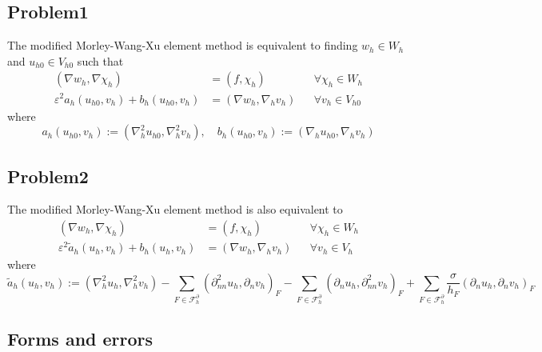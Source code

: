 \documentclass[11pt]{article}
\begin{document}
    \subsection{Problem1}\label{problem1}

    The modified Morley-Wang-Xu element method is equivalent to finding
\(w_{h} \in W_{h}\) and \(u_{h 0} \in V_{h 0}\) such that \[
\begin{aligned}
\left(\nabla w_{h}, \nabla \chi_{h}\right) &=\left(f, \chi_{h}\right) & & \forall \chi_{h} \in W_{h} \\
\varepsilon^{2} a_{h}\left(u_{h 0}, v_{h}\right)+b_{h}\left(u_{h 0}, v_{h}\right) &=\left(\nabla w_{h}, \nabla_{h} v_{h}\right) & & \forall v_{h} \in V_{h 0}
\end{aligned}
\] where \[
a_{h}\left(u_{h 0}, v_{h}\right):=\left(\nabla_{h}^{2} u_{h 0}, \nabla_{h}^{2} v_{h}\right), \quad b_{h}\left(u_{h 0}, v_{h}\right):=\left(\nabla_{h} u_{h 0}, \nabla_{h} v_{h}\right)
\]

    \subsection{Problem2}\label{problem2}

    The modified Morley-Wang-Xu element method is also equivalent to \[
\begin{aligned}
\left(\nabla w_{h}, \nabla \chi_{h}\right) &=\left(f, \chi_{h}\right) & & \forall \chi_{h} \in W_{h} \\
\varepsilon^{2} \tilde{a}_{h}\left(u_{h}, v_{h}\right)+b_{h}\left(u_{h}, v_{h}\right) &=\left(\nabla w_{h}, \nabla_{h} v_{h}\right) & & \forall v_{h} \in V_{h}
\end{aligned}
\] where \[
\tilde{a}_{h}\left(u_{h}, v_{h}\right):=\left(\nabla_{h}^{2} u_{h}, \nabla_{h}^{2} v_{h}\right)-\sum_{F \in \mathcal{F}_{h}^{\partial}}\left(\partial_{n n}^{2} u_{h}, \partial_{n} v_{h}\right)_{F}-\sum_{F \in \mathcal{F}_{h}^{\partial}}\left(\partial_{n} u_{h}, \partial_{n n}^{2} v_{h}\right)_{F}+\sum_{F \in \mathcal{F}_{h}^{\partial}} \frac{\sigma}{h_{F}}\left(\partial_{n} u_{h}, \partial_{n} v_{h}\right)_{F}
\]

    \subsection{Forms and errors}\label{forms-and-errors}
\end{document}
